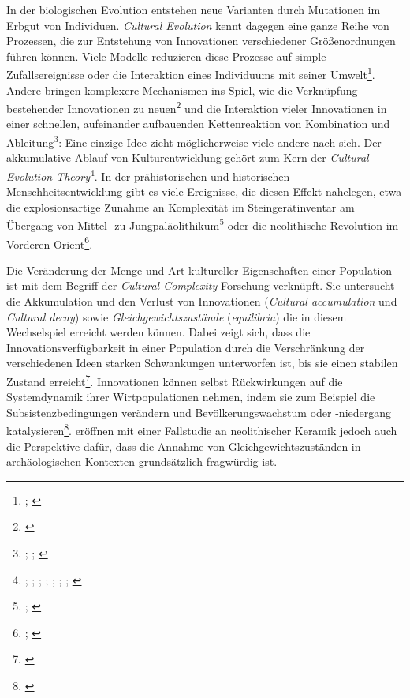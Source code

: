 \documentclass[openany,twoside,twocolumn]{book}
\let\rmarkdownfootnote\footnote%
\def\footnote{\protect\rmarkdownfootnote}
\begin{document}
In der biologischen Evolution entstehen neue Varianten durch Mutationen
im Erbgut von Individuen. \emph{Cultural Evolution} kennt dagegen eine
ganze Reihe von Prozessen, die zur Entstehung von Innovationen
verschiedener Größenordnungen führen können. Viele Modelle reduzieren
diese Prozesse auf simple Zufallsereignisse oder die Interaktion eines
Individuums mit seiner Umwelt\footnote{\textcite{henrich_evolution_2003};
  \textcite{rendell_why_2010}}. Andere bringen komplexere Mechanismen
ins Spiel, wie die Verknüpfung bestehender Innovationen zu
neuen\footnote{\textcite{enquist_why_2008}} und die Interaktion vieler
Innovationen in einer schnellen, aufeinander aufbauenden Kettenreaktion
von Kombination und Ableitung\footnote{\textcite{fogarty_cultural_2015};
  \textcite{kolodny_evolution_2015};
  \textcite{kolodny_game-changing_2016}}: Eine einzige Idee zieht
möglicherweise viele andere nach sich. Der akkumulative Ablauf von
Kulturentwicklung gehört zum Kern der \emph{Cultural Evolution
Theory}\footnote{\textcite{basalla_evolution_1988};
  \textcite{boyd_culture_1985}; \textcite{boyd_evolutionary_1988};
  \textcite{cavalli-sforza_cultural_1981};
  \textcite{durham_adaptive_1976}; \textcite{feldman_gene-culture_1996};
  \textcite{henrich_evolution_2003}; \textcite{lumsden_genes_1981}}. In
der prähistorischen und historischen Menschheitsentwicklung gibt es
viele Ereignisse, die diesen Effekt nahelegen, etwa die explosionsartige
Zunahme an Komplexität im Steingerätinventar am Übergang von Mittel- zu
Jungpaläolithikum\footnote{\textcite{bar-yosef_nature_1998};
  \textcite{roebroeks_time_2008}} oder die neolithische Revolution im
Vorderen Orient\footnote{\textcite{gopher_when_2001};
  \textcite{veen_agricultural_2010}}.

Die Veränderung der Menge und Art kultureller Eigenschaften einer
Population ist mit dem Begriff der \emph{Cultural Complexity} Forschung
verknüpft. Sie untersucht die Akkumulation und den Verlust von
Innovationen (\emph{Cultural accumulation} und \emph{Cultural decay})
sowie \emph{Gleichgewichtszustände} (\emph{equilibria}) die in diesem
Wechselspiel erreicht werden können. Dabei zeigt sich, dass die
Innovationsverfügbarkeit in einer Population durch die Verschränkung der
verschiedenen Ideen starken Schwankungen unterworfen ist, bis sie einen
stabilen Zustand erreicht\footnote{\textcite{kolodny_evolution_2015}}.
Innovationen können selbst Rückwirkungen auf die Systemdynamik ihrer
Wirtpopulationen nehmen, indem sie zum Beispiel die
Subsistenzbedingungen verändern und Bevölkerungswachstum oder
-niedergang katalysieren\footnote{\textcite{kolodny_game-changing_2016}}.
\textcite{crema_revealing_2016} eröffnen mit einer Fallstudie an
neolithischer Keramik jedoch auch die Perspektive dafür, dass die
Annahme von Gleichgewichtszuständen in archäologischen Kontexten
grundsätzlich fragwürdig ist.
\end{document}

